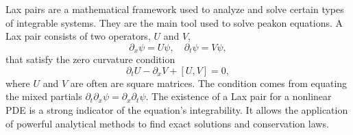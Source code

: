 \documentclass[english,master]{liumaiex}
\theoremstyle{plain}
\theoremstyle{definition}
\begin{document}
Lax pairs are a mathematical framework used to analyze and solve certain types of integrable systems. They are the main tool used to solve peakon equations. A Lax pair consists of two operators, $U$ and $V$,
\begin{equation}
	\partial_x \psi = U \psi, \quad \partial_t \psi = V \psi,
\end{equation}
that satisfy the zero curvature condition
\begin{equation}
	\partial_t U - \partial_x V + [U, V] = 0,
\end{equation}
where $U$ and $V$ are often are square matrices. The condition comes from equating the mixed partials $\partial_t \partial_x \psi = \partial_x \partial_t \psi$. The existence of a Lax pair for a nonlinear PDE is a strong indicator of the equation's integrability. It allows the application of powerful analytical methods to find exact solutions and conservation laws.
\end{document}
